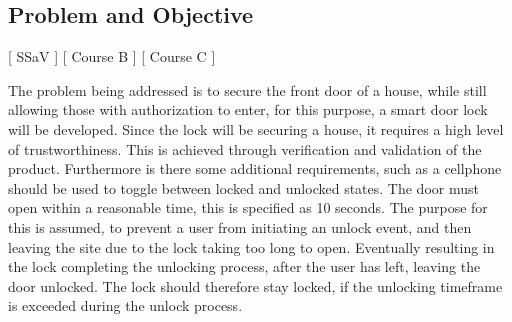 \subsection{Problem and Objective}
[ SSaV ] [ Course B ] [ Course C ] 
\newline
[ Casper ] [ Author B ] [ Author C ] 
\newline






The problem being addressed is to secure the front door of a house, while still allowing those with authorization to enter, for this purpose, a smart door lock will be developed.
Since the lock will be securing a house, it requires a high level of trustworthiness.
This is achieved through verification and validation of the product.
Furthermore is there some additional requirements, such as a cellphone should be used to toggle between locked and unlocked states.
The door must open within a reasonable time, this is specified as 10 seconds.
The purpose for this is assumed, to prevent a user from initiating an unlock event, and then leaving the site due to the lock taking too long to open.
Eventually resulting in the lock completing the unlocking process, after the user has left, leaving the door unlocked.
The lock should therefore stay locked, if the unlocking timeframe is exceeded during the unlock process.